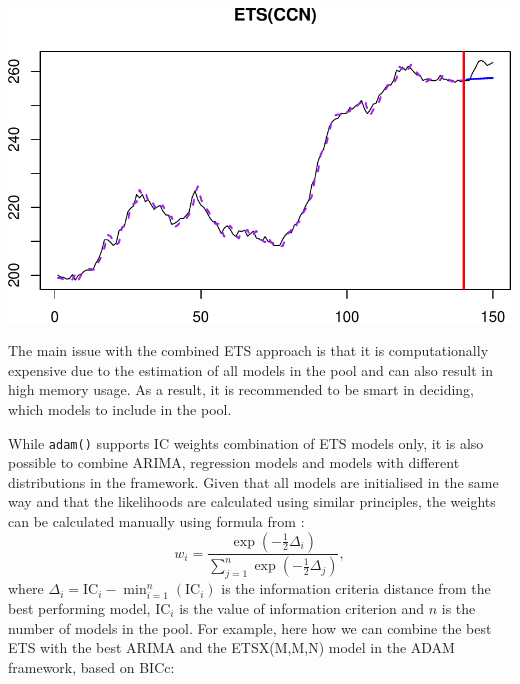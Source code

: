 \documentclass[
]{book}
\theoremstyle{definition}
\theoremstyle{definition}
\theoremstyle{definition}
\theoremstyle{definition}
\theoremstyle{remark}
\begin{document}
\includegraphics{adam_files/figure-latex/adamETSCCNPureAdditive-1.pdf}

The main issue with the combined ETS approach is that it is computationally expensive due to the estimation of all models in the pool and can also result in high memory usage. As a result, it is recommended to be smart in deciding, which models to include in the pool.

While \texttt{adam()} supports IC weights combination of ETS models only, it is also possible to combine ARIMA, regression models and models with different distributions in the framework. Given that all models are initialised in the same way and that the likelihoods are calculated using similar principles, the weights can be calculated manually using formula from \citet{Burnham2004}:
\begin{equation}
    w_i = \frac{\exp\left(-\frac{1}{2}\Delta_i\right)}{\sum_{j=1}^n \exp\left(-\frac{1}{2}\Delta_j\right)},
  \label{eq:ETSADAMStateSpaceEstimated}
\end{equation}
where \(\Delta_i=\mathrm{IC}_i - \min_{i=1}^n \left(\mathrm{IC}_i\right)\) is the information criteria distance from the best performing model, \(\mathrm{IC}_i\) is the value of information criterion and \(n\) is the number of models in the pool. For example, here how we can combine the best ETS with the best ARIMA and the ETSX(M,M,N) model in the ADAM framework, based on BICc:
\end{document}
